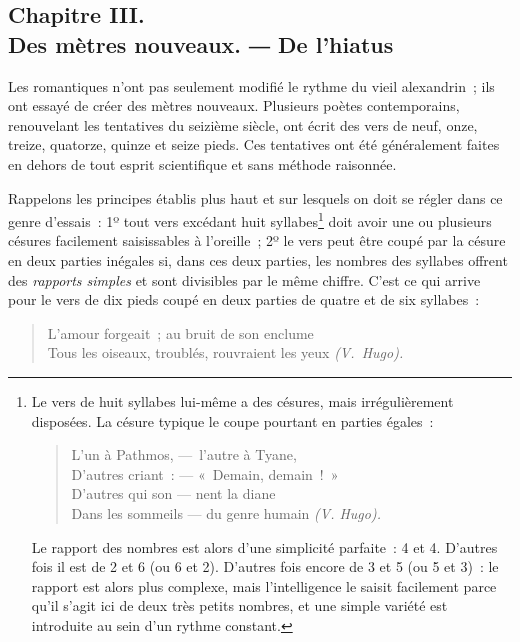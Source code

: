 \documentclass[french,twoside]{book} %
\begin{document}
\subsection[{Chapitre III. Des mètres nouveaux. ― De l’hiatus}]{Chapitre III. \\
Des mètres nouveaux. ― De l’hiatus}
\noindent  Les romantiques n’ont pas seulement modifié le rythme du vieil alexandrin ; ils ont essayé de créer des mètres nouveaux. Plusieurs poètes contemporains, renouvelant les tentatives du seizième siècle, ont écrit des vers de neuf, onze, treize, quatorze, quinze et seize pieds. Ces tentatives ont été généralement faites en dehors de tout esprit scientifique et sans méthode raisonnée.\par
Rappelons les principes établis plus haut et sur lesquels on doit se régler dans ce genre d’essais : 1º tout vers excédant huit syllabes\footnote{\noindent Le vers de huit syllabes lui-même a des césures, mais irrégulièrement disposées. La césure typique le coupe pourtant en parties égales :\par

\begin{verse}
L’un à Pathmos, — l’autre à Tyane,\\
D’autres criant : — « Demain, demain ! »\\
D’autres qui son — nent la diane\\
Dans les sommeils — du genre humain \emph{(V. Hugo).}\\
\end{verse}
\par
\noindent Le rapport des nombres est alors d’une simplicité parfaite : 4 et 4. D’autres fois il est de 2 et 6 (ou 6 et 2). D’autres fois encore de 3 et 5 (ou 5 et 3) : le rapport est alors plus complexe, mais l’intelligence le saisit facilement parce qu’il s’agit ici de deux très petits nombres, et une simple variété est introduite au sein d’un rythme constant.
} doit avoir une ou plusieurs césures  facilement saisissables à l’oreille ; 2º le vers peut être coupé par la césure en deux parties inégales si, dans ces deux parties, les nombres des syllabes offrent des \emph{rapports simples} et sont divisibles par le même chiffre. C’est ce qui arrive pour le vers de dix pieds coupé en deux parties de quatre et de six syllabes :\par


\begin{verse}
L’amour forgeait ; au bruit de son enclume\\
Tous les oiseaux, troublés, rouvraient les yeux \emph{(V. Hugo).}\\
\end{verse}
\end{document}
